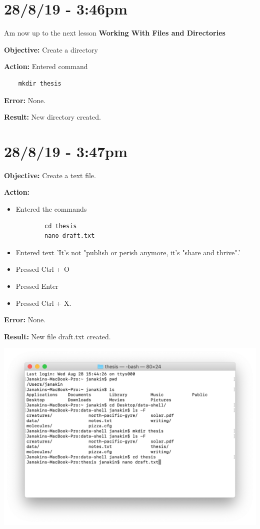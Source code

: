 \documentclass{article}
\begin{document}
\section*{28/8/19 - 3:46pm}

Am now up to the next lesson \textbf{Working With Files and Directories}

\textbf{Objective:} Create a directory

\textbf{Action:} Entered command \begin{verbatim}
    mkdir thesis
\end{verbatim}

\textbf{Error:} None.

\textbf{Result:} New directory created.

\section*{28/8/19 - 3:47pm}

\textbf{Objective:} Create a text file.

\textbf{Action:}
\begin{itemize}
    \item Entered the commands \begin{verbatim}
        cd thesis
        nano draft.txt
    \end{verbatim}
    \item Entered text 'It's not "publish or perish anymore,
    it's "share and thrive".'
    \item Pressed Ctrl + O
    \item Pressed Enter
    \item Pressed Ctrl + X.
\end{itemize}

\textbf{Error:} None.

\textbf{Result:} New file draft.txt created.

\includegraphics[width=\textwidth]{fige.png}
\end{document}
